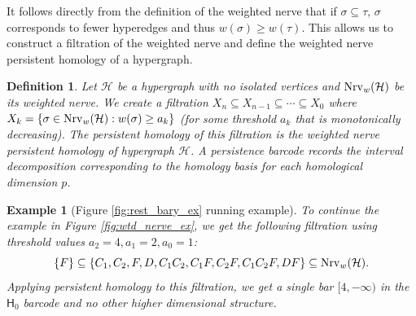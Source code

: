 \documentclass{amsart}
\newtheorem{definition}[theorem]{Definition}
\newtheorem{example}[theorem]{Example}
\newcommand{\Hgroup}	     {\mathsf{H}}
\renewcommand{\H}{\mathcal{H}}
\newcommand{\Nrv}{\mm{\mathrm{Nrv}}}
\newcommand {\mm}[1]        {\ifmmode{#1}\else{\mbox{\(#1\)}}\fi}
\begin{document}
It follows directly from the definition of the weighted nerve that if $\sigma \subseteq \tau$,  $\sigma$ corresponds to fewer hyperedges and thus $w(\sigma) \geq w(\tau)$. This allows us to construct a filtration of the weighted nerve and define the weighted nerve persistent homology of a hypergraph.
\begin{definition}
    Let $\H$ be a hypergraph with no isolated vertices and $\Nrv_w(\H)$ be its weighted nerve. We create a filtration $X_n \subseteq X_{n-1} \subseteq \cdots \subseteq X_0$ where $X_k = \{\sigma \in \Nrv_w(\H) : w(\sigma) \geq a_k\}$ (for some threshold $a_k$ that is monotonically decreasing). The persistent homology of this filtration is the \emph{weighted nerve persistent homology} of hypergraph $\H$. %
    A persistence \emph{barcode} records the interval decomposition corresponding to the homology basis for each homological dimension $p$.
\end{definition}

\begin{example}[Figure \ref{fig:rest_bary_ex} running example]
To continue the example in Figure \ref{fig:wtd_nerve_ex}, we get the following filtration using threshold values $a_2=4, a_1=2, a_0=1$:
\[
 \{F\} \subseteq\{C_1, C_2, F, D, C_1C_2, C_1F, C_2F, C_1C_2F, DF\} \subseteq \Nrv_w(\H).
\]
Applying persistent homology to this filtration, we get a single bar $[4, -\infty)$ in the $\Hgroup_0$ barcode and no other higher dimensional structure.
\end{example}
\end{document}
